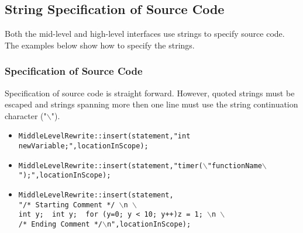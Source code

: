 
\subsection{String Specification of Source Code}
    Both the mid-level and high-level interfaces use strings to
specify source code. The examples below show how to specify 
the strings.
\subsubsection{Specification of Source Code}
    Specification of source code is straight forward.
However, quoted strings must be escaped and strings spanning
more then one line must use the string continuation character ("$\backslash$").
\begin{itemize}
   \item {\tt MiddleLevelRewrite::insert(statement,"int newVariable;",locationInScope);}
   \item {\tt MiddleLevelRewrite::insert(statement,"timer($\backslash$"functionName$\backslash$");",locationInScope);}
   \item {\tt MiddleLevelRewrite::insert(statement,\\ "/* Starting Comment */
    $\backslash$n $\backslash$\\ int y; { int y; } for (y=0; y < 10; y++){z = 1;}
    $\backslash$n $\backslash$\\ /* Ending Comment */$\backslash$n",locationInScope);}
\end{itemize}

